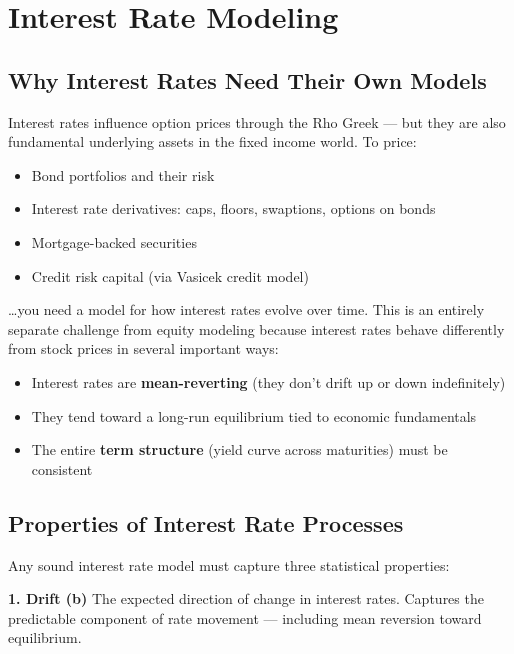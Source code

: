 \documentclass[12pt,openany]{book}
\theoremstyle{definition}
\theoremstyle{remark}
\begin{document}
\section{Interest Rate Modeling}
\subsection{Why Interest Rates Need Their Own Models}
Interest rates influence option prices through the Rho Greek --- but they are also fundamental underlying assets in the fixed income world. To price:

\begin{itemize}
\item Bond portfolios and their risk


\item Interest rate derivatives: caps, floors, swaptions, options on bonds


\item Mortgage-backed securities


\item Credit risk capital (via Vasicek credit model)


\end{itemize}
…you need a model for how interest rates evolve over time. This is an entirely separate challenge from equity modeling because interest rates behave differently from stock prices in several important ways:

\begin{itemize}
\item Interest rates are \textbf{mean-reverting} (they don't drift up or down indefinitely)


\item They tend toward a long-run equilibrium tied to economic fundamentals


\item The entire \textbf{term structure} (yield curve across maturities) must be consistent


\end{itemize}
\medskip
\subsection{Properties of Interest Rate Processes}
Any sound interest rate model must capture three statistical properties:

\textbf{1. Drift (b)} The expected direction of change in interest rates. Captures the predictable component of rate movement --- including mean reversion toward equilibrium.
\end{document}
